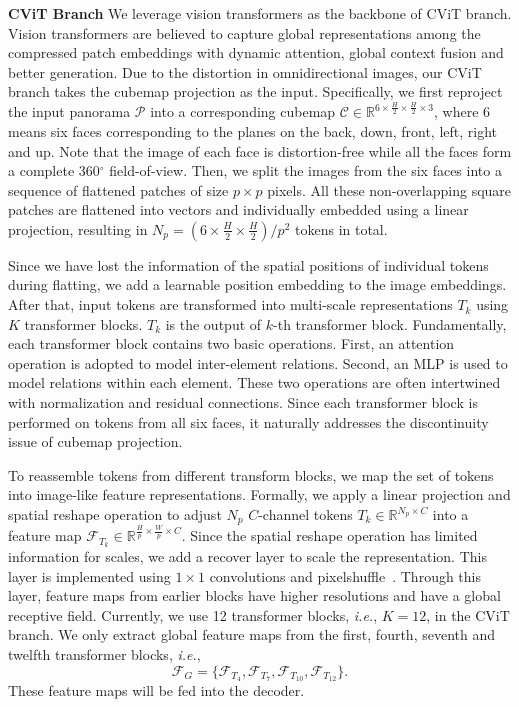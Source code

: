 \documentclass[10pt,twocolumn,letterpaper]{article}
\begin{document}
\textbf{CViT Branch }
We leverage vision transformers \cite{vit} as the backbone of CViT branch. Vision transformers are believed to capture global representations among the compressed patch embeddings with dynamic attention, global context fusion and better generation. Due to the distortion in omnidirectional images, our CViT branch takes the cubemap projection as the input. Specifically, we first reproject the input panorama $\mathcal{P}$ into a corresponding cubemap $\mathcal{C}\in \mathbb{R}^{6\times \frac{H}{2}\times \frac{H}{2}\times 3}$, where 6 means six faces corresponding to the planes on the back, down, front, left, right and up. Note that the image of each face is distortion-free while all the faces form a complete 360$^\circ$ field-of-view.
Then, we split the images from the six faces into a sequence of flattened patches of size $p\times p$ pixels. All these non-overlapping square patches are flattened into vectors and individually embedded using a linear projection, resulting in $N_p=(6\times \frac{H}{2}\times  \frac{H}{2})/p^2$ tokens in total.

Since we have lost the information of the spatial positions of individual tokens during flatting, we add a learnable position embedding to the image embeddings.
After that, input tokens are transformed into multi-scale representations ${T_k}$ using $K$ transformer blocks. ${T_k}$ is the output of $k$-th transformer block. 
Fundamentally, each transformer block contains two basic operations. First, an attention operation is adopted to model inter-element relations. Second, an MLP is used to model relations within each element. These two operations are often intertwined with normalization and residual connections. Since each transformer block is performed on tokens from all six faces, it naturally addresses the discontinuity issue of cubemap projection.

To reassemble tokens from different transform blocks, we map the set of tokens into image-like feature representations. Formally, we apply a linear projection and spatial reshape operation to adjust $N_p$ $C$-channel tokens $T_k \in \mathbb{R}^{N_p\times C}$ into a feature map $\mathcal{F}_{T_k}\in \mathbb{R}^ {\frac{H}{p}\times \frac{W}{p} \times C}$. Since the spatial reshape operation has limited information for scales, we add a recover layer to scale the representation. This layer is implemented using $1\times 1$ convolutions and pixelshuffle~\cite{pixelshuffle}. Through this layer, feature maps from earlier blocks have higher resolutions and have a global receptive field. Currently, we use 12 transformer blocks, \emph{i.e.}, $K=12$, in the CViT branch. We only extract global feature maps from the first, fourth, seventh and twelfth transformer blocks, \emph{i.e.},
\begin{equation}
    \mathcal{F}_{G} = \{\mathcal{F}_{T_{4}},\mathcal{F}_{T_{7}}, \mathcal{F}_{T_{10}}, \mathcal{F}_{T_{12}}\}.
\end{equation}
These feature maps will be fed into the decoder.
\end{document}

